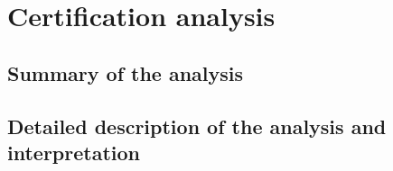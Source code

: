 \section{Certification analysis}

\subsection{Summary of the analysis}

\subsection{Detailed description of the analysis and interpretation}